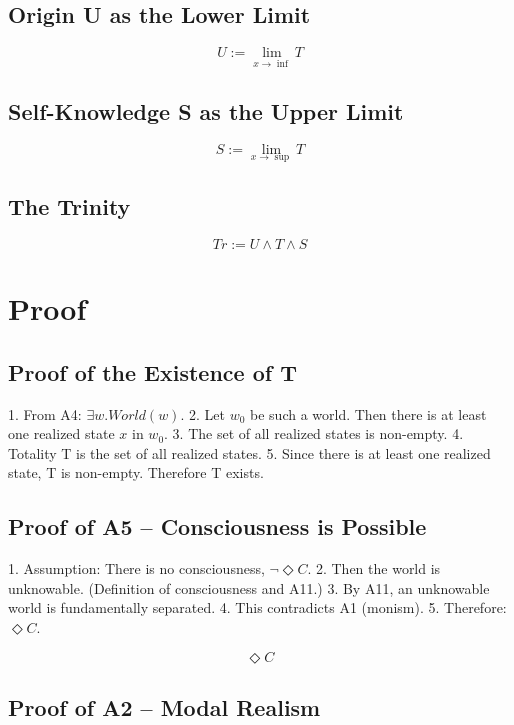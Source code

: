 \documentclass[
]{article}
\begin{document}
\subsection{Origin U as the Lower Limit}\label{origin-u-as-the-lower-limit}

\[
\boxed{U := \lim_{x \to \inf} T}
\]

\subsection{Self-Knowledge S as the Upper Limit}\label{self-knowledge-s-as-the-upper-limit}

\[
\boxed{S := \lim_{x \to \sup} T}
\]

\subsection{The Trinity}\label{the-trinity}

\[
\boxed{Tr := U \land T \land S}
\]

\section{Proof}\label{proof}

\subsection{Proof of the Existence of T}\label{proof-of-the-existence-of-t}

1. From A4: \(\exists w. World(w)\).
2. Let \(w_0\) be such a world. Then there is at least one realized state \(x\) in \(w_0\).
3. The set of all realized states is non-empty.
4. Totality T is the set of all realized states.
5. Since there is at least one realized state, T is non-empty. Therefore T exists.

\subsection{Proof of A5 – Consciousness is Possible}\label{proof-of-a5-consciousness-is-possible}

1. Assumption: There is no consciousness, \(\neg \Diamond C\).
2. Then the world is unknowable. (Definition of consciousness and A11.)
3. By A11, an unknowable world is fundamentally separated.
4. This contradicts A1 (monism).
5. Therefore: \(\Diamond C\).

\[
\boxed{\Diamond C}
\]

\subsection{Proof of A2 – Modal Realism}\label{proof-of-a2-modal-realism}
\end{document}
